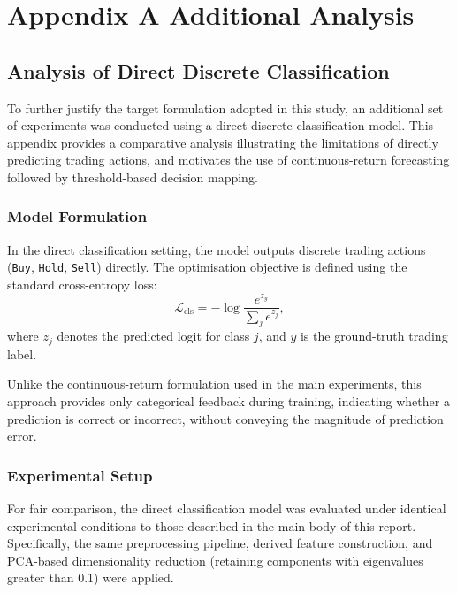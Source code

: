 \documentclass[10pt]{article} %
\begin{document}
\section{Appendix A Additional Analysis} 

\subsection{Analysis of Direct Discrete Classification}
\label{app:direct_classification}

To further justify the target formulation adopted in this study, an additional set of experiments was conducted using a direct discrete classification model. 
This appendix provides a comparative analysis illustrating the limitations of directly predicting trading actions, and motivates the use of continuous-return forecasting followed by threshold-based decision mapping.

\subsubsection{Model Formulation}

In the direct classification setting, the model outputs discrete trading actions (\texttt{Buy}, \texttt{Hold}, \texttt{Sell}) directly. 
The optimisation objective is defined using the standard cross-entropy loss:
\begin{equation}
\mathcal{L}_{\text{cls}}
= - \log
\frac{e^{z_y}}{\sum_{j} e^{z_j}},
\end{equation}
where $z_j$ denotes the predicted logit for class $j$, and $y$ is the ground-truth trading label.

Unlike the continuous-return formulation used in the main experiments, this approach provides only categorical feedback during training, indicating whether a prediction is correct or incorrect, without conveying the magnitude of prediction error.

\subsubsection{Experimental Setup}

For fair comparison, the direct classification model was evaluated under identical experimental conditions to those described in the main body of this report. 
Specifically, the same preprocessing pipeline, derived feature construction, and PCA-based dimensionality reduction (retaining components with eigenvalues greater than 0.1) were applied.
\end{document}
